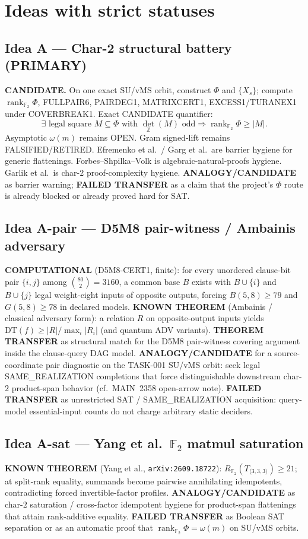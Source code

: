 \documentclass[11pt]{article}
\begin{document}
\section*{Ideas with strict statuses}
\subsection*{Idea A --- Char-2 structural battery (PRIMARY)}
\textbf{CANDIDATE.} On one exact SU/vMS orbit, construct $\Phi$ and $\{X_s\}$;
compute $\operatorname{rank}_{\mathbb F_2}\Phi$, FULLPAIR6, PAIRDEG1, MATRIXCERT1,
EXCESS1/TURANEX1 under COVERBREAK1. Exact CANDIDATE quantifier:
\[
\exists\text{ legal square }M\subseteq\Phi\text{ with }\det_{\mathbb Z}(M)\text{ odd}
\Rightarrow\operatorname{rank}_{\mathbb F_2}\Phi\ge|M|.
\]
Asymptotic $\omega(m)$ remains OPEN. Gram signed-lift remains FALSIFIED/RETIRED.
Efremenko et al.\ / Garg et al.\ are barrier hygiene for generic flattenings.
Forbes--Shpilka--Volk is algebraic-natural-proofs hygiene. Garlik et al.\ is
char-$2$ proof-complexity hygiene.
\textbf{ANALOGY/CANDIDATE} as barrier warning; \textbf{FAILED TRANSFER} as a claim
that the project's $\Phi$ route is already blocked or already proved hard for SAT.

\subsection*{Idea A-pair --- D5M8 pair-witness / Ambainis adversary}
\textbf{COMPUTATIONAL} (D5M8-CERT1, finite): for every unordered clause-bit pair
$\{i,j\}$ among $\binom{80}{2}=3160$, a common base $B$ exists with
$B\cup\{i\}$ and $B\cup\{j\}$ legal weight-eight inputs of opposite outputs,
forcing $B(5,8)\ge 79$ and $G(5,8)\ge 78$ in declared models.
\textbf{KNOWN THEOREM} (Ambainis / classical adversary form): a relation $R$ on
opposite-output inputs yields
$\mathrm{DT}(f)\ge |R|/\max_i|R_i|$ (and quantum ADV variants).
\textbf{THEOREM TRANSFER} as structural match for the D5M8 pair-witness covering
argument inside the clause-query DAG model.
\textbf{ANALOGY/CANDIDATE} for a source-coordinate pair diagnostic on the
TASK-001 SU/vMS orbit: seek legal SAME\_REALIZATION completions that force
distinguishable downstream char-$2$ product-span behavior
(cf.\ MAIN~2358 open-arrow note).
\textbf{FAILED TRANSFER} as unrestricted SAT / SAME\_REALIZATION acquisition:
query-model essential-input counts do not charge arbitrary static deciders.

\subsection*{Idea A-sat --- Yang et al.\ $\mathbb F_2$ matmul saturation}
\textbf{KNOWN THEOREM} (Yang et al., \texttt{arXiv:2609.18722}):
$R_{\mathbb F_2}(T_{\langle 3,3,3\rangle})\ge 21$; at split-rank equality,
summands become pairwise annihilating idempotents, contradicting forced
invertible-factor profiles.
\textbf{ANALOGY/CANDIDATE} as char-$2$ saturation / cross-factor idempotent
hygiene for product-span flattenings that attain rank-additive equality.
\textbf{FAILED TRANSFER} as Boolean SAT separation or as an automatic proof that
$\operatorname{rank}_{\mathbb F_2}\Phi=\omega(m)$ on SU/vMS orbits.
\end{document}
